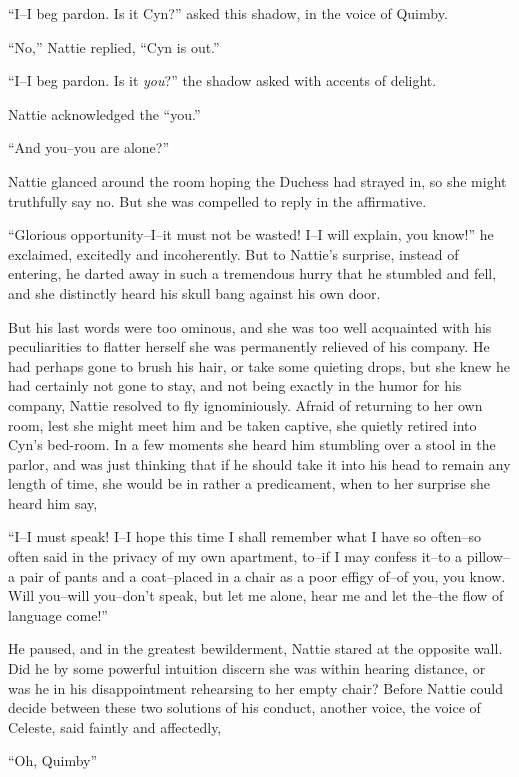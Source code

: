 ``I--I beg pardon. Is it Cyn?'' asked this shadow, in the voice of Quimby.

``No,'' Nattie replied, ``Cyn is out.''

``I--I beg pardon. Is it \emph{you}?'' the shadow asked with accents of delight.

Nattie acknowledged the ``you.''

``And you--you are alone?''

Nattie glanced around the room hoping the Duchess had strayed in, so she
might truthfully say no. But she was compelled to reply in the
affirmative.

``Glorious opportunity--I--it must not be wasted! I--I will explain, you
know!'' he exclaimed, excitedly and incoherently. But to Nattie's
surprise, instead of entering, he darted away in such a tremendous hurry
that he stumbled and fell, and she distinctly heard his skull bang
against his own door.

But his last words were too ominous, and she was too well acquainted
with his peculiarities to flatter herself she was permanently relieved
of his company. He had perhaps gone to brush his hair, or take some
quieting drops, but she knew he had certainly not gone to stay, and not
being exactly in the humor for his company, Nattie resolved to fly
ignominiously. Afraid of returning to her own room, lest she might meet
him and be taken captive, she quietly retired into Cyn's bed-room. In a
few moments she heard him stumbling over a stool in the parlor, and was
just thinking that if he should take it into his head to remain any
length of time, she would be in rather a predicament, when to her
surprise she heard him say,

``I--I must speak! I--I hope this time I shall remember what I have so
often--so often said in the privacy of my own apartment, to--if I may
confess it--to a pillow--a pair of pants and a coat--placed in a chair
as a poor effigy of--of you, you know. Will you--will you--don't speak,
but let me alone, hear me and let the--the flow of language come!''

He paused, and in the greatest bewilderment, Nattie stared at the
opposite wall. Did he by some powerful intuition discern she was within
hearing distance, or was he in his disappointment rehearsing to her
empty chair? Before Nattie could decide between these two solutions of
his conduct, another voice, the voice of Celeste, said faintly and
affectedly,

``Oh, Quimby''

